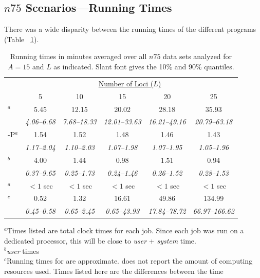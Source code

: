 \documentclass[11pt]{article}
\begin{document}
{\subsection{$n75$ Scenarios---Running Times}
There was a wide disparity between the running times of the different programs (Table~
\ref{tab:n75times}). 
\begin{table}
\caption{Running times in minutes averaged over all $n75$ data sets analyzed for $A=15$ and 
$L$ as indicated. Slant font gives the 10\% and 90\% quantiles.\label{tab:n75times}}
\begin{center}
\begin{tabular}{lccccc}
  & \multicolumn{5}{c}{\underline{Number of Loci ($L$)}} \\
        & 5  &  10  &  15  &  20  &  25 \\ \hline
\colony{}$^a$  &  5.45  &  12.15  &  20.02  &  28.18  &  35.93 \\
           &  {\sl 4.06--6.68}  &  {\sl 7.68--18.33}  &  {\sl 12.01--33.63}  &  {\sl 16.21--49.16}  &  {\sl 20.79--63.18} \\
\colony{}-P$^a$  &  1.54  &  1.52  &  1.48  &  1.46  &  1.43 \\
           &  {\sl 1.17--2.04}  &  {\sl 1.10--2.03}  &  {\sl 1.07--1.98}  &  {\sl 1.07--1.95}  &  {\sl 1.05--1.96} \\
\prt{}$^b$  &  4.00  &  1.44  &  0.98  &  1.51  &  0.94 \\
        &  {\sl 0.37--9.65}  &  {\sl 0.25--1.73}  &  {\sl 0.24--1.46}  &  {\sl 0.26--1.52}  &  {\sl 0.28--1.53} \\
\familyfinder{}$^a$  &  $<1$ sec  &  $<1$ sec  &  $<1$ sec  &  $<1$ sec  &  $<1$ sec \\
\kinalyzer{}$^c$  &  0.52  &  1.32  &  16.61  &  49.86  &  134.99 \\
              &  {\sl 0.45--0.58}  &  {\sl 0.65--2.45}  &  {\sl 0.65--43.93}  &  {\sl 17.84--78.72}  &  {\sl 66.97--166.62} \\
\end{tabular}
\end{center}
{\footnotesize $^a$Times listed are total clock times for each job.  Since each job was run on
a dedicated processor, this will be close to {\em user} + {\em system} time.}\\
{\footnotesize $^b${\em user} times}\\
{\footnotesize $^c$Running times for \kinalyzer{} are approximate. \kinalyzer{} does not report
the amount of computing resources used. Times listed here are the differences between the time
}
\end{table}}
\end{document}
